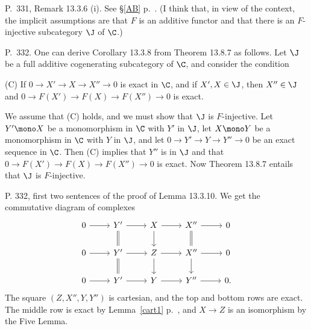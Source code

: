 \documentclass[12pt]{article}
\theoremstyle{remark}
\theoremstyle{definition}
\begin{document}
%

\begin{s}
P.~331, Remark 13.3.6 (i). See \S\ref{AB} p.~. (I think that, in view of the context, the implicit assumptions are that $F$ is an additive functor and that there is an $F$-injective subcategory $\J$ of $\C$.) %


\end{s}

%

\begin{s}
P.~332. One can derive Corollary 13.3.8 from Theorem 13.8.7 as follows. Let $\J$ be a full additive cogenerating subcategory of $\C$, and consider the condition

\nn(C) If $0\to X'\to X\to X''\to0$ is exact in $\C$, and if $X',X\in\J$, then $X''\in\J$ and $0\to F(X')\to F(X)\to F(X'')\to0$ is exact.

We assume that (C) holds, and we must show that $\J$ is $F$-injective. Let $Y'\mono X$ be a monomorphism in $\C$ with $Y'$ in $\J$, let $X\mono Y$ be a monomorphism in $\C$ with $Y$ in $\J$, and let $0\to Y'\to Y\to Y''\to0$ be an exact sequence in $\C$. Then (C) implies that $Y''$ is in $\J$ and that $0\to F(X')\to F(X)\to F(X'')\to0$ is exact. Now Theorem 13.8.7 entails that $\J$ is $F$-injective.
\end{s}

%

\begin{s}
P. 332, first two sentences of the proof of Lemma 13.3.10. We get the commutative diagram of complexes 
$$
\begin{tikzcd}
0\ar[r]&Y'\ar[d,equal]\ar[r]&X\ar[d]\ar[r]&X''\ar[d,equal]\ar[r]&0\\ 
0\ar[r]&Y'\ar[d,equal]\ar[r]&Z\ar[d]\ar[r]&X''\ar[d]      \ar[r]&0\\ 
0\ar[r]&Y'            \ar[r]&Y      \ar[r]&Y''            \ar[r]&0.
\end{tikzcd} 
$$ 
The square $(Z,X'',Y,Y'')$ is cartesian, and the top and bottom rows are exact. The middle row is exact by Lemma~\ref{cart1} p.~, and $X\to Z$ is an isomorphism by the Five Lemma.
\end{s}
\end{document}
